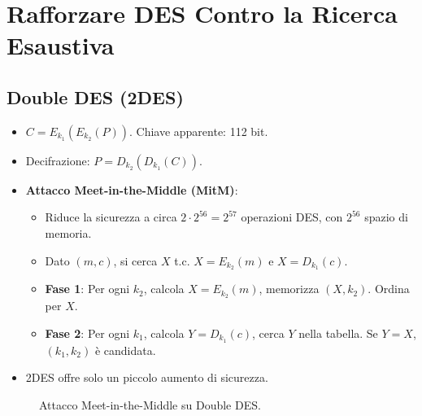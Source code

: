 \section{Rafforzare DES Contro la Ricerca Esaustiva}

\subsection{Double DES (2DES)}
\begin{itemize}
    \item $C = E_{k_1}(E_{k_2}(P))$. Chiave apparente: 112 bit.
    \item Decifrazione: $P = D_{k_2}(D_{k_1}(C))$.
    \item \textbf{Attacco Meet-in-the-Middle (MitM)}:
    \begin{itemize}
        \item Riduce la sicurezza a circa $2 \cdot 2^{56} = 2^{57}$ operazioni DES, con $2^{56}$ spazio di memoria.
        \item Dato $(m,c)$, si cerca $X$ t.c. $X = E_{k_2}(m)$ e $X = D_{k_1}(c)$.
        \item \textbf{Fase 1}: Per ogni $k_2$, calcola $X = E_{k_2}(m)$, memorizza $(X, k_2)$. Ordina per $X$.
        \item \textbf{Fase 2}: Per ogni $k_1$, calcola $Y = D_{k_1}(c)$, cerca $Y$ nella tabella. Se $Y=X$, $(k_1, k_2)$ è candidata.
    \end{itemize}
    \item 2DES offre solo un piccolo aumento di sicurezza.
\end{itemize}

\begin{figure}[H]
\centering
{}
\caption{Attacco Meet-in-the-Middle su Double DES.}
\end{figure}

